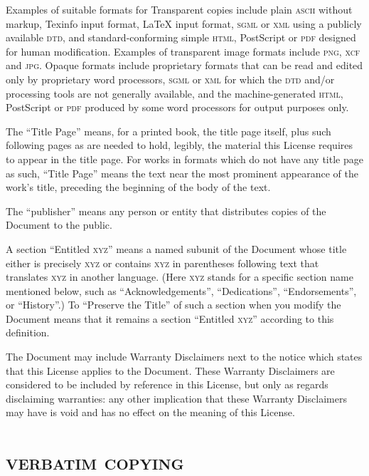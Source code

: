 Examples of suitable formats for Transparent copies include plain
\textsc{ascii} without markup, Texinfo input format, LaTeX input format,
\textsc{sgml} or \textsc{xml} using a publicly available \textsc{dtd}, and
standard-conforming simple \textsc{html}, PostScript or \textsc{pdf}
designed for human modification. Examples of transparent image formats
include \textsc{png}, \textsc{xcf} and \textsc{jpg}. Opaque formats include
proprietary formats that can be read and edited only by proprietary word
processors, \textsc{sgml} or \textsc{xml} for which the \textsc{dtd} and/or
processing tools are not generally available, and the machine-generated
\textsc{html}, PostScript or \textsc{pdf} produced by some word processors
for output purposes only.

The ``Title Page'' means, for a printed book, the title page itself, plus
such following pages as are needed to hold, legibly, the material this
License requires to appear in the title page. For works in formats which do
not have any title page as such, ``Title Page'' means the text near the
most prominent appearance of the work's title, preceding the beginning of
the body of the text.

The ``publisher'' means any person or entity that distributes copies of the
Document to the public.

A section ``Entitled \textsc{xyz}'' means a named subunit of the Document
whose title either is precisely \textsc{xyz} or contains \textsc{xyz} in
parentheses following text that translates \textsc{xyz} in another
language. (Here \textsc{xyz} stands for a specific section name mentioned
below, such as ``Acknowledgements'', ``Dedications'', ``Endorsements'', or
``History''.)  To ``Preserve the Title'' of such a section when you modify
the Document means that it remains a section ``Entitled \textsc{xyz}''
according to this definition.

\shortpage[2]{}
The Document may include Warranty Disclaimers next to the notice which
states that this License applies to the Document. These Warranty
Disclaimers are considered to be included by reference in this License, but
only as regards disclaiming warranties: any other implication that these
Warranty Disclaimers may have is void and has no effect on the meaning of
this License.


\section[Verbatim copying]{\scshape verbatim copying}\label{sec:copy}

